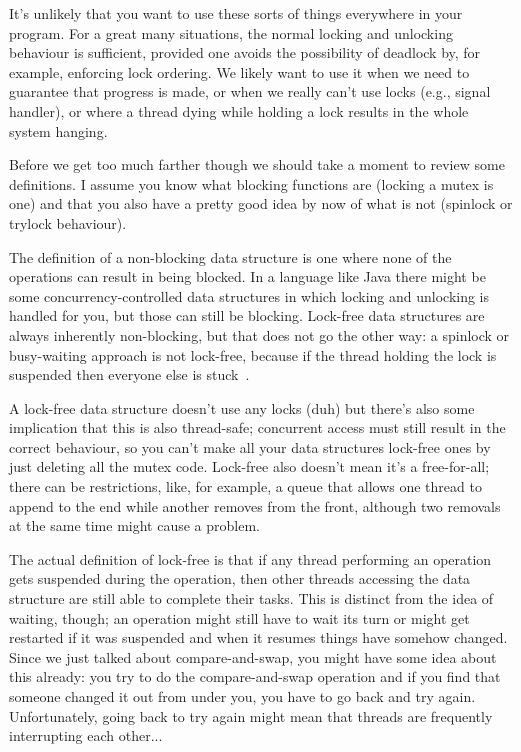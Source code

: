 It's unlikely that you want to use these sorts of things everywhere in your program. For a great many situations, the normal locking and unlocking behaviour is sufficient, provided one avoids the possibility of deadlock by, for example, enforcing lock ordering. We likely want to use it when we need to guarantee that progress is made, or when we really can't use locks (e.g., signal handler), or where a thread dying while holding a lock results in the whole system hanging.

Before we get too much farther though we should take a moment to review some definitions. I assume you know what blocking functions are (locking a mutex is one) and that you also have a pretty good idea by now of what is not (spinlock or trylock behaviour). 

The definition of a non-blocking data structure is one where none of the operations can result in being blocked. In a language like Java there might be some concurrency-controlled data structures in which locking and unlocking is handled for you, but those can still be blocking. Lock-free data structures are always inherently non-blocking, but that does not go the other way: a spinlock or busy-waiting approach is not lock-free, because if the thread holding the lock is suspended then everyone else is stuck~\cite{nblfwf}.

A lock-free data structure doesn't use any locks (duh) but there's also some implication that this is also thread-safe; concurrent access must still result in the correct behaviour, so you can't make all your data structures lock-free ones by just deleting all the mutex code. Lock-free also doesn't mean it's a free-for-all; there can be restrictions, like, for example, a queue that allows one thread to append to the end while another removes from the front, although two removals at the same time might cause a problem.

The actual definition of lock-free is that if any thread performing an operation gets suspended during the operation, then other threads accessing the data structure are still able to complete their tasks. This is distinct from the idea of waiting, though; an operation might still have to wait its turn or might get restarted if it was suspended and when it resumes things have somehow changed. Since we just talked about compare-and-swap, you might have some idea about this already: you try to do the compare-and-swap operation and if you find that someone changed it out from under you, you have to go back and try again. Unfortunately, going back to try again might mean that threads are frequently interrupting each other...

